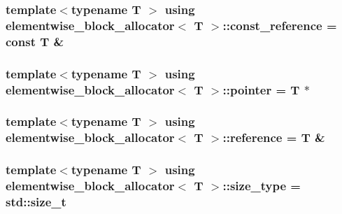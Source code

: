 \subsubsection[{\texorpdfstring{const\+\_\+reference}{const_reference}}]{\setlength{\rightskip}{0pt plus 5cm}template$<$typename T $>$ using {\bf elementwise\+\_\+block\+\_\+allocator}$<$ T $>$\+::{\bf const\+\_\+reference} =  const T \&}\hypertarget{classelementwise__block__allocator_af7d02fdeb779527f9cc8723f8cebc40b}{}\label{classelementwise__block__allocator_af7d02fdeb779527f9cc8723f8cebc40b}
\subsubsection[{\texorpdfstring{pointer}{pointer}}]{\setlength{\rightskip}{0pt plus 5cm}template$<$typename T $>$ using {\bf elementwise\+\_\+block\+\_\+allocator}$<$ T $>$\+::{\bf pointer} =  T $\ast$}\hypertarget{classelementwise__block__allocator_af41c83aed240eb55e53155abdd714ec6}{}\label{classelementwise__block__allocator_af41c83aed240eb55e53155abdd714ec6}
\subsubsection[{\texorpdfstring{reference}{reference}}]{\setlength{\rightskip}{0pt plus 5cm}template$<$typename T $>$ using {\bf elementwise\+\_\+block\+\_\+allocator}$<$ T $>$\+::{\bf reference} =  T \&}\hypertarget{classelementwise__block__allocator_a7bfdf1ff6d23bcd486ef3c6541f738f2}{}\label{classelementwise__block__allocator_a7bfdf1ff6d23bcd486ef3c6541f738f2}
\subsubsection[{\texorpdfstring{size\+\_\+type}{size_type}}]{\setlength{\rightskip}{0pt plus 5cm}template$<$typename T $>$ using {\bf elementwise\+\_\+block\+\_\+allocator}$<$ T $>$\+::{\bf size\+\_\+type} =  std\+::size\+\_\+t}\hypertarget{classelementwise__block__allocator_a5a93e8060385c80ebaa62ec6e1b0d37e}{}\label{classelementwise__block__allocator_a5a93e8060385c80ebaa62ec6e1b0d37e}
